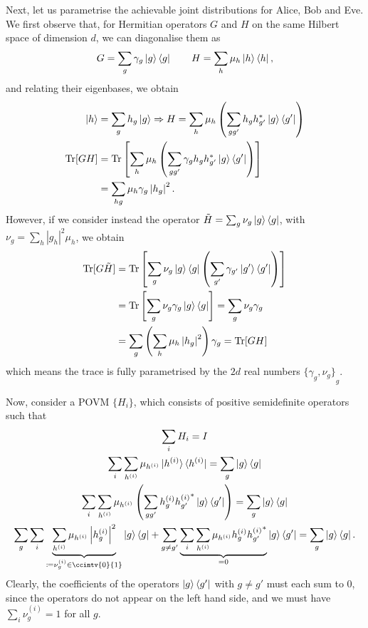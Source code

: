 \documentclass[10pt, a4paper]{article}
\numberwithin{equation}{section} %
\theoremstyle{definition}
\theoremstyle{plain}
\newcommand{\abs}[1]{\left\lvert#1\right\rvert}
\newcommand{\?}{\mathrel{?}} %
\newcommand{\Tr}{\mathrm{Tr}} %
\begin{document}
    Next, let us parametrise the achievable joint distributions for Alice, Bob and Eve. We first observe that, for Hermitian operators \(G\) and \(H\) on the same Hilbert space of dimension \(d\), we can diagonalise them as
    \[ G = \sum_g \gamma_g \ket{g}\bra{g} \qquad H = \sum_h \mu_h \ket{h}\bra{h}, \]
    and relating their eigenbases, we obtain
    \begin{align*}
      \ket{h} &= \sum_g h_g \ket{g} \Rightarrow H = \sum_h \mu_h \left(\sum_{gg'} h_g h_{g'}^* \ket{g}\bra{g'}\right) \\
      \Tr[GH] &= \Tr\left[ \sum_h \mu_h \left( \sum_{gg'} \gamma_g h_g h_{g'}^* \ket{g}\bra{g'} \right) \right] \\
      &= \sum_{hg} \mu_h \gamma_g \abs{h_g}^2.
    \end{align*}
    However, if we consider instead the operator \(\tilde{H} = \sum_g \nu_{g} \ket{g}\bra{g}\), with \(\nu_{g} = \sum_h \abs{g_h}^2 \mu_h\), we obtain
    \begin{align*}
      \Tr[G\tilde{H}] &= \Tr\left[ \sum_g \nu_{g} \ket{g}\bra{g} \left(\sum_{g'} \gamma_{g'} \ket{g'}\bra{g'} \right) \right] \\
      &= \Tr\left[ \sum_{g} \nu_{g}\gamma_{g}\ket{g}\bra{g} \right] = \sum_{g} \nu_{g}\gamma_{g} \\
      &= \sum_{g} \left(\sum_{h} \mu_h \abs{h_g}^2\right) \gamma_{g} = \Tr[GH]
    \end{align*}
    which means the trace is fully parametrised by the \(2d\) real numbers \({\{\gamma_g, \nu_{g}\}}_{g}\).

    Now, consider a POVM \(\{H_i\}\), which consists of positive semidefinite operators such that
    \begin{gather*}
      \sum_i H_i = I \\
      \sum_i \sum_{h^{(i)}} \mu_{h^{(i)}} \ket{h^{(i)}}\bra{h^{(i)}} = \sum_g \ket{g}\bra{g} \\
      \sum_i \sum_{h^{(i)}} \mu_{h^{(i)}} \left(\sum_{gg'} h^{(i)}_g {h^{(i)}_{g'}}^* \ket{g}\bra{g'}\right) = \sum_g \ket{g}\bra{g} \\
      \sum_{g} \sum_i \underbrace{\sum_{h^{(i)}} \mu_{h^{(i)}} \abs{h^{(i)}_g}^2}_{\coloneqq \nu_g^{(i)} \in \ccintv{0}{1}} \ket{g}\bra{g} + \sum_{g \neq g'} \underbrace{ \sum_i \sum_{h^{(i)}} \mu_{h^{(i)}} h^{(i)}_g {h^{(i)}_{g'}}^* }_{=0} \ket{g}\bra{g'} = \sum_g \ket{g}\bra{g}.
    \end{gather*}
    Clearly, the coefficients of the operators \(\ket{g}\bra{g'}\) with \(g \neq g'\) must each sum to 0, since the operators do not appear on the left hand side, and we must have \(\sum_i \nu_g^{(i)} = 1\) for all \(g\).
\end{document}

